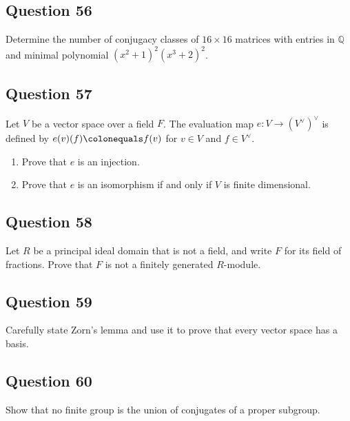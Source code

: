\documentclass[12pt]{article}
\begin{document}
\hypertarget{question-56}{%
\subsection{Question 56}\label{question-56}}

Determine the number of conjugacy classes of \(16 \times 16\) matrices
with entries in \(\mathbb{Q}\) and minimal polynomial
\((x^2+1)^2(x^3+2)^2\).

\hypertarget{question-57}{%
\subsection{Question 57}\label{question-57}}

Let \(V\) be a vector space over a field \(F\). The evaluation map
\(e\colon V \to (V^\vee)^\vee\) is defined by
\(e(v)(f) \colonequals f(v)\) for \(v\in V\) and \(f\in V^\vee\).

\begin{enumerate}
\def\labelenumi{\arabic{enumi}.}
\item
  Prove that \(e\) is an injection.
\item
  Prove that \(e\) is an isomorphism if and only if \(V\) is finite
  dimensional.
\end{enumerate}

\hypertarget{question-58}{%
\subsection{Question 58}\label{question-58}}

Let \(R\) be a principal ideal domain that is not a field, and write
\(F\) for its field of fractions. Prove that \(F\) is not a finitely
generated \(R\)-module.

\hypertarget{question-59}{%
\subsection{Question 59}\label{question-59}}

Carefully state Zorn's lemma and use it to prove that every vector space
has a basis.

\hypertarget{question-60}{%
\subsection{Question 60}\label{question-60}}

Show that no finite group is the union of conjugates of a proper
subgroup.
\end{document}
